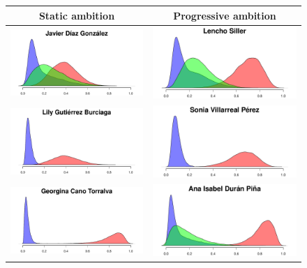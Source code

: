 \documentclass[letter,12pt]{article}
\begin{document}
\begin{figure}
  \centering
  \begin{tabular}{cc}
    Static ambition & Progressive ambition \\ \hline
    \includegraphics[width=.45\columnwidth]{../graphs/prReconoce1.pdf} &
    \includegraphics[width=.45\columnwidth]{../graphs/prReconoce6.pdf} \\
    \includegraphics[width=.45\columnwidth]{../graphs/prReconoce2.pdf} &
    \includegraphics[width=.45\columnwidth]{../graphs/prReconoce5.pdf} \\
    \includegraphics[width=.45\columnwidth]{../graphs/prReconoce3.pdf} &
    \includegraphics[width=.45\columnwidth]{../graphs/prReconoce4.pdf} \\

\end{tabular}
\end{figure}
\end{document}
